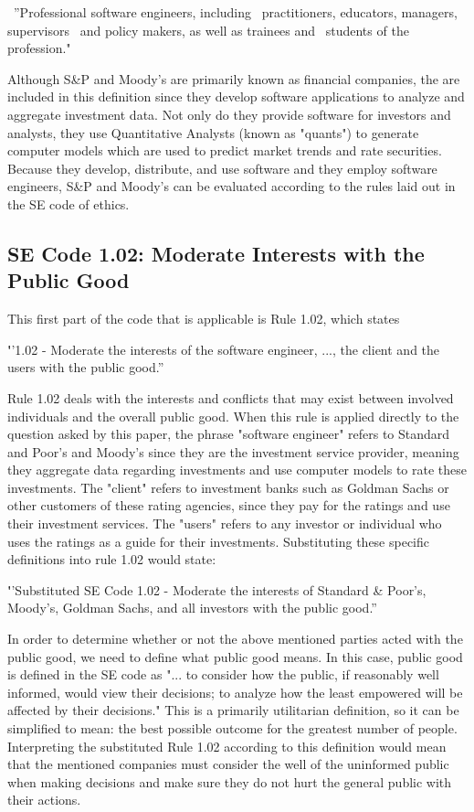 \documentclass[11pt]{article}
\begin{document}
\begin{multicols}{2}
\ ''Professional software engineers, including
\ practitioners, educators, managers, supervisors
\ and policy makers, as well as trainees and
\ students of the profession."

Although S\&P and Moody's are primarily known as financial companies, the are included in this definition since they develop software applications to analyze and aggregate investment data. \cite{SnP, Moodys} Not only do they provide software for investors and analysts, they use Quantitative Analysts (known as "quants") to generate computer models which are used to predict market trends and rate securities. \cite{quantsRole, govtReport}  Because they develop, distribute, and use software and they employ software engineers, S\&P and Moody's can be evaluated according to the rules laid out in the SE code of ethics. 

\subsection{SE Code 1.02: Moderate Interests with the Public Good}
This first part of the code that is applicable is Rule 1.02, which states
 

{\addtolength{\leftskip}{6mm}
{\textbf''1.02 - Moderate the interests of the software engineer, ..., the client and the users with the public good.''}
}


Rule 1.02 deals with the interests and conflicts that may exist between involved individuals and the overall public good.  When this rule is applied directly to the question asked by this paper, the phrase "software engineer" refers to Standard and Poor's and Moody's since they are the investment service provider, meaning they aggregate data regarding investments and use computer models to rate these investments. The "client" refers to investment banks such as Goldman Sachs or other customers of these rating agencies, since they pay for the ratings and use their investment services.  The "users" refers to any investor or individual who uses the ratings as a guide for their investments.  Substituting these specific definitions into rule 1.02 would state:


{\addtolength{\leftskip}{6mm}
{\textbf''Substituted SE Code 1.02 - Moderate the interests of Standard \& Poor's, Moody's, Goldman Sachs, and all investors with the public good.''}
}


In order to determine whether or not the above mentioned parties acted with the public good, we need to define what public good means.  In this case, public good is defined in the SE code as "... to consider how the public, if reasonably well informed, would view their decisions; to analyze how the least empowered will be affected by their decisions." \cite{SECode}  This is a primarily utilitarian definition, so it can be simplified to mean: the best possible outcome for the greatest number of people.  Interpreting the substituted Rule 1.02 according to this definition would mean that the mentioned companies must consider the well of the uninformed public when making decisions and make sure they do not hurt the general public with their actions.
  

\end{multicols}
\end{document}
